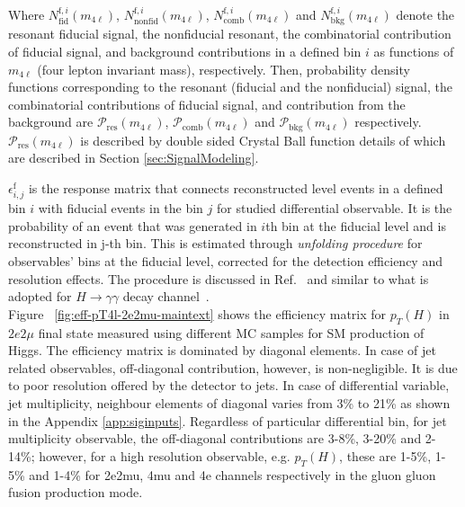 Where  $N_{\mathrm{fid}}^{\mathrm{f},i}(m_{4\ell})$, $N_{\mathrm{nonfid}}^{\mathrm{f},i}(m_{4\ell})$, $N_{\mathrm{comb}}^{\mathrm{f},i}(m_{4\ell})$
and $N_{\mathrm{bkg}}^{\mathrm{f},i}(m_{4\ell})$ denote the resonant fiducial signal, the nonfiducial resonant, the combinatorial contribution of
fiducial signal, and background contributions in a defined bin $i$ as functions of $m_{4\ell}$ (four lepton invariant mass), respectively.
Then, probability density functions corresponding to the resonant (fiducial and the nonfiducial) signal, the combinatorial contributions of fiducial signal, and contribution from the background  are  $\mathcal{P}_{\mathrm{res}}(m_{4\ell})$, $\mathcal{P}_{\mathrm{comb}}(m_{4\ell})$ and $\mathcal{P}_{\mathrm{bkg}}(m_{4\ell})$  respectively.
$\mathcal{P}_{\mathrm{res}}(m_{4\ell})$ is described by double sided Crystal Ball function details of which are described in Section \ref{sec:SignalModeling}. 


$\epsilon_{i,j}^{\mathrm{f}}$ is  the  response matrix that connects reconstructed level events in a defined bin $i$ with fiducial events in the bin $j$
for studied differential observable. It is the probability of an event that was generated in $i$th bin at the fiducial level and is reconstructed
in j-th bin. 
This is estimated through \textit{unfolding procedure} for observables' bins at the fiducial level, corrected for the detection efficiency and resolution effects. The procedure is discussed in Ref.~\cite{Prosper:2011zz} and similar to what is adopted for $H \rightarrow \gamma\gamma$ decay channel~\cite{CMS:HIG-14-016}.\\
Figure ~\ref{fig:eff-pT4l-2e2mu-maintext} shows the efficiency matrix for $p_{T}(H)$ in  $2e2\mu$ final state measured using different MC samples for SM production of Higgs. The efficiency matrix is
dominated by diagonal elements.
In case of jet related observables, off-diagonal contribution, however, is non-negligible. It is due to poor resolution offered by the detector to jets.
In case of differential variable, jet multiplicity,  neighbour elements of diagonal varies from 3\% to 21\% as shown 
in the Appendix \ref{app:siginputs}.
Regardless of particular differential bin, for jet multiplicity observable, the off-diagonal contributions are 3-8\%, 3-20\% and 2-14\%; however, for a high resolution observable, e.g. $p_{T}(H)$, these are 1-5\%, 1-5\% and 1-4\% for 2e2mu, 4mu and 4e channels respectively in the gluon gluon fusion production mode.


